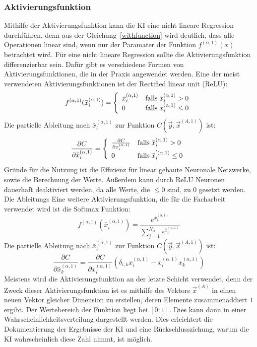 \documentclass[11pt]{article}
\begin{document}
\subsubsection{Aktivierungsfunktion}\label{activation}
Mithilfe der Aktivierungsfunktion kann die KI eine nicht lineare Regression durchführen, denn aus der Gleichung~\ref{withfunction} wird deutlich,
dass alle Operationen linear sind, wenn nur der Paramater der Funktion $f^{(\alpha,1)}(x)$ betrachtet wird. Für eine nicht lineare Regression sollte die
Aktivierungsfunktion differenzierbar sein. Dafür gibt es verschiedene Formen von Aktivierungsfunktionen, die in der Praxis angewendet werden.
Eine der meist verwendeten Aktivierungsfunktionen ist der Rectified linear unit (ReLU):
\begin{equation}
    f^{(\alpha,1)}(\bar{x}_{i}^{(\alpha,1)}) = \left\{
	\begin{array}{ll}
		\bar{x}_i^{(\alpha,1)}  & \mathrm{falls} \mkern5mu \bar{x}_i^{(\alpha,1)} > 0 \\
		0 & \mathrm{falls} \mkern5mu \bar{x}_i^{(\alpha,1)} \leq 0
	\end{array}
    \right.
\end{equation}
Die partielle Ableitung nach $\bar{x}_i^{(\alpha,1)}$ zur Funktion $C(\vec{y},\vec{x}^{(A,1)})$ ist:
\begin{equation}
    \frac{\partial C}{\partial \bar{x}_i^{(\alpha,1)}} = \left\{
	\begin{array}{ll}
		\frac{\partial C}{\partial {x}_i^{(\alpha,1)}}  & \mathrm{falls} \mkern5mu \bar{x}_i^{(\alpha,1)} > 0 \\
		0 & \mathrm{falls} \mkern5mu \bar{x}_i^{'(\alpha,1)} \leq 0
	\end{array}
    \right.
\end{equation}
Gründe für die Nutzung ist die Effizienz für linear gebaute Neuronale Netzwerke, sowie die Berechnung der Werte. Außerdem kann durch ReLU
Neuronen dauerhaft deaktiviert werden, da alle Werte, die $\leq 0$ sind, zu $0$ gesetzt werden.
Die Ableitungs
Eine weitere Aktivierungsfunktion, die für die Facharbeit verwendet wird ist die Softmax Funktion:
\begin{equation}\label{softmax}
    f^{(\alpha,1)}(\bar{x}_{i}^{(\alpha,1)}) = \frac{e^{\bar{x}_i^{(\alpha,1)}}}{\sum_{j=1}^{N_{\alpha}} e^{\bar{x}_i^{(\alpha,1)}}}
\end{equation}
Die partielle Ableitung nach $\bar{x}_i^{(\alpha,1)}$ zur Funktion $C(\vec{y},\vec{x}^{(A,1)})$ ist:
\begin{equation}
    \frac{\partial C}{\partial \bar{x}_k^{(\alpha,1)}} = \frac{\partial C}{\partial {x}_i^{(\alpha,1)}} (\delta_{i,k}x_{i}^{(\alpha,1)}-x_{i}^{(\alpha,1)}x_{k}^{(\alpha,1)})
\end{equation}
Meistens wird die Aktivierungsfunktion an der letzte Schicht verwendet, denn der Zweck dieser Aktivierungsfunktion ist es mithilfe des Vektors
$ \vec{x}^{(A)} $ in einen neuen Vektor gleicher Dimension zu erstellen, deren Elemente zusammenaddiert $1$ ergibt. Der Wertebereich der Funktion
liegt bei $[0;1]$. Dies kann dann in einer Wahrscheinlichkeitsverteilung dargestellt werden. Dies erleichtert die Dokumentierung der Ergebnisse der KI
und eine Rückschlussziehung, warum die KI wahrscheinlich diese Zahl nimmt, ist möglich.
\end{document}
